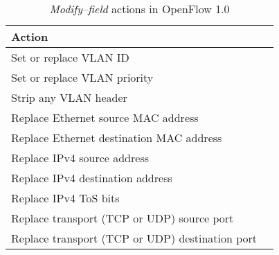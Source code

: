 \begin{table}
\begin{tabular}{|l|l|}
\hline \textbf{Action} \\
\hline Set or replace VLAN ID \\
\hline Set or replace VLAN priority \\
\hline Strip any VLAN header \\
\hline Replace Ethernet source MAC address \\
\hline Replace Ethernet destination MAC address \\
\hline Replace IPv4 source address \\
\hline Replace IPv4 destination address \\
\hline Replace IPv4 \ac{ToS} bits \\
\hline Replace transport (TCP or UDP) source port \\
\hline Replace transport (TCP or UDP) destination port \\
\hline
\end{tabular}
\caption{{\em Modify--field} actions in OpenFlow 1.0}
\label{table:openflow-1.0.mods}
\end{table}
